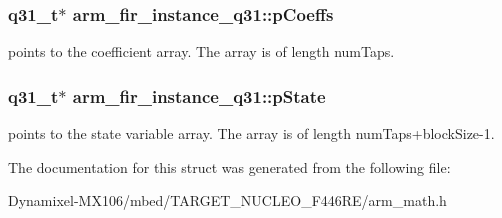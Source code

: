 \subsubsection[{\texorpdfstring{p\+Coeffs}{pCoeffs}}]{\setlength{\rightskip}{0pt plus 5cm}q31\+\_\+t$\ast$ arm\+\_\+fir\+\_\+instance\+\_\+q31\+::p\+Coeffs}\hypertarget{structarm__fir__instance__q31_afaae4c884bdf11a4ec2f3b9bb2bb51d0}{}\label{structarm__fir__instance__q31_afaae4c884bdf11a4ec2f3b9bb2bb51d0}
points to the coefficient array. The array is of length num\+Taps. 
\subsubsection[{\texorpdfstring{p\+State}{pState}}]{\setlength{\rightskip}{0pt plus 5cm}q31\+\_\+t$\ast$ arm\+\_\+fir\+\_\+instance\+\_\+q31\+::p\+State}\hypertarget{structarm__fir__instance__q31_a409f39c93b744784648bdc365541444d}{}\label{structarm__fir__instance__q31_a409f39c93b744784648bdc365541444d}
points to the state variable array. The array is of length num\+Taps+block\+Size-\/1. 

The documentation for this struct was generated from the following file\+:\begin{DoxyCompactItemize}
\item 
Dynamixel-\/\+M\+X106/mbed/\+T\+A\+R\+G\+E\+T\+\_\+\+N\+U\+C\+L\+E\+O\+\_\+\+F446\+R\+E/arm\+\_\+math.\+h\end{DoxyCompactItemize}
